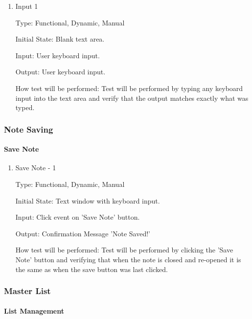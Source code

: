 \documentclass[12pt, titlepage]{article}
\begin{document}
\begin{enumerate}
	
	\item{Input 1\\}
	
	Type: Functional, Dynamic, Manual
	
	Initial State: Blank text area.
	
	Input: User keyboard input.
	
	Output: User keyboard input.
	
	How test will be performed: Test will be performed by typing any keyboard input into 
	the text area and verify that the output matches exactly what was typed.
	
\end{enumerate}

\subsubsection{Note Saving}

\paragraph{Save Note}

\begin{enumerate}
	
	\item{Save Note - 1\\}
	
	Type: Functional, Dynamic, Manual
	
	Initial State: Text window with keyboard input.
	
	Input: Click event on 'Save Note' button.
	
	Output: Confirmation Message 'Note Saved!'
	
	How test will be performed: Test will be performed by clicking the 'Save Note' button 
	and verifying that when the note is closed and re-opened it is the same as when the 
	save button	was last clicked. 
	
\end{enumerate}

\subsubsection{Master List}

\paragraph{List Management}
\end{document}
